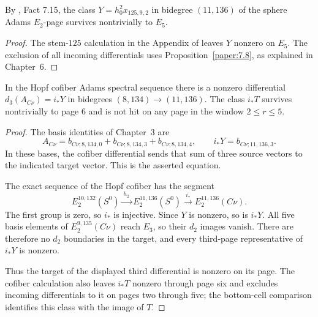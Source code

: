 \begin{fact}
\label{sem:Computation:y-to-e5}
By \cite{LWX126}, Fact 7.15, the class
$Y=h_0^2x_{125,9,2}$ in bidegree $(11,136)$ of the sphere Adams
$E_2$-page survives nontrivially to $E_5$.
\end{fact}
\begin{proof}
The stem-$125$ calculation in the Appendix of \cite{LWX126} leaves
$Y$ nonzero on $E_5$. The exclusion of all incoming differentials uses
Proposition~\ref{paper:7.8}, as explained in Chapter~6.
\end{proof}

\begin{theorem}
\label{sem:Computation:cofiber-results}
In the Hopf cofiber Adams spectral sequence there is a nonzero
differential $d_3(A_{C\nu})=i_*Y$ in bidegrees
$(8,134)\to(11,136)$. The class $i_*T$ survives nontrivially to page $6$
and is not hit on any page in the window $2\leq r\leq5$.
\end{theorem}
\begin{proof}
The basis identities of Chapter~3 are
\[
 A_{C\nu}=b_{C\nu;8,134,0}+b_{C\nu;8,134,3}+b_{C\nu;8,134,4},
 \qquad i_*Y=b_{C\nu;11,136,3}.
\]
In these bases, the cofiber differential sends that sum of three source
vectors to the indicated target vector. This is the asserted equation.

The exact sequence of the Hopf cofiber has the segment
\[
 E_2^{10,132}(S^0)\xrightarrow{\ h_2\ }
 E_2^{11,136}(S^0)\xrightarrow{\ i_*\ }E_2^{11,136}(C\nu).
\]
The first group is zero, so $i_*$ is injective.
Since $Y$ is nonzero, so is $i_*Y$. All five basis elements of
$E_2^{9,135}(C\nu)$ reach $E_3$, so their $d_2$ images vanish.
There are therefore no $d_2$ boundaries in the target, and every
third-page representative of $i_*Y$ is nonzero.

Thus the target of the displayed third differential is nonzero on
its page. The cofiber calculation also leaves $i_*T$ nonzero through
page six and excludes incoming differentials to it on pages two
through five;
the bottom-cell comparison identifies this class with the image of $T$.
\end{proof}



